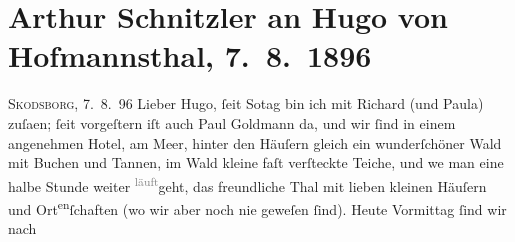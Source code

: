 

         
         \renewcommand{\erwaehntePersonen}{Personen:  ?? [Frau des Leuchtturmwärters],  ?? [Leuchtturmwärter],  ?? [Teenagertochter eines Leuchtturmwärters], Richard Beer-Hofmann, Paula Beer-Hofmann, Paul Goldmann, Hugo von Hofmannsthal, Henrik Ibsen, Peter Nansen}
         \renewcommand{\erwaehnteOrte}{Orte: Badehotel, Berlin, Göteborg, Kopenhagen, Nordkap, Oslo, Ostsee, Skodsborg, Trondheim, Ven, Wien}
         \renewcommand{\erwaehnteWerke}{Werke: Freiwild. Schauspiel in 3 Akten, Geschichte der beiden Liebespaare}
               \section[Arthur Schnitzler an Hugo von Hofmannsthal, 7. 8. 1896]{ Arthur Schnitzler an Hugo von Hofmannsthal, 7. 8. 1896}\nopagebreak{}\rehead{ }\begin{ledgroupsized}[t]{13cm}\normalsize\beginnumbering \toendnotes[C]{\smallbreak\pagebreak[2]} 
\toendnotes[C]{\smallbreak}\pstart
           \raggedleft{}{\pb}\textsc{Skodsborg},
                            7. 8. 96\pend
           \pstart
           Lieber Hugo, ſeit So{\geminationn}tag bin ich mit Richard (und
                        Paula) zuſa{\geminationm}en; ſeit vorgeſtern iſt auch Paul Goldmann
                    da, und wir ſind in einem angenehmen Hotel, am Meer, hinter den Häuſern gleich
                    ein wunderſchöner Wald mit Buchen und Tannen, im Wald kleine faſt verſteckte
                    Teiche, und we{\geminationn} man eine halbe Stunde weiter \substVorne{}\textsuperscript{\textcolor{gray}{läuft}}\substDazwischen{}geht\substHinten{}, das freundliche Thal mit lieben kleinen Häuſern und Ort\substVorne{}\textsuperscript{en}\substDazwischen{}ſchaften\substHinten{} (wo wir aber noch nie geweſen ſind). Heute Vormittag ſind wir nach

\end{ledgroupsized}
